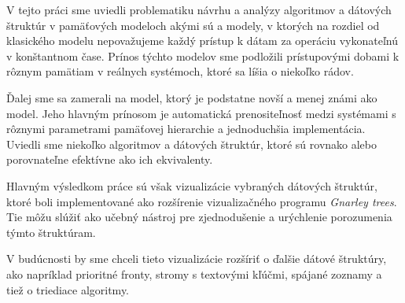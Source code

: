 V tejto práci sme uviedli problematiku návrhu a analýzy algoritmov a dátových štruktúr v pamäťových modeloch akými sú \aware a \obliv modely, v ktorých na rozdiel od klasického \RAM modelu nepovažujeme každý prístup k dátam za operáciu vykonateľnú v konštantnom čase. Prínos týchto modelov sme podložili prístupovými dobami k rôznym pamätiam v reálnych systémoch, ktoré sa líšia o niekoľko rádov.

Ďalej sme sa zamerali na \obliv model, ktorý je podstatne novší a menej známi ako \aware model. Jeho hlavným prínosom je automatická prenositeľnosť medzi systémami s rôznymi parametrami pamäťovej hierarchie a jednoduchšia implementácia. Uviedli sme niekoľko \obliv algoritmov a dátových štruktúr, ktoré sú rovnako alebo porovnateľne efektívne ako ich \aware ekvivalenty.

Hlavným výsledkom práce sú však vizualizácie vybraných \obliv dátových štruktúr, ktoré boli implementované ako rozšírenie vizualizačného programu \emph{Gnarley trees}. Tie môžu slúžiť ako učebný nástroj pre zjednodušenie a urýchlenie porozumenia týmto štruktúram.

V budúcnosti by sme chceli tieto vizualizácie rozšíriť o ďalšie \obliv dátové štruktúry, ako napríklad prioritné fronty, stromy s textovými kľúčmi, spájané zoznamy a tiež o \obliv triediace algoritmy.